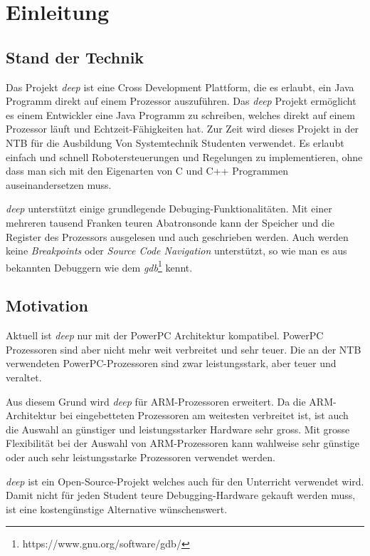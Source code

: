 \chapter{Einleitung}


\section{Stand der Technik}
Das Projekt \textit{deep} \cite{bib:DeepHome} ist eine Cross Development Plattform, die es erlaubt, ein Java Programm direkt auf einem Prozessor auszuführen.
Das \textit{deep} Projekt ermöglicht es einem Entwickler eine Java Programm zu schreiben, welches direkt auf einem Prozessor läuft und Echtzeit-Fähigkeiten hat.
Zur Zeit wird dieses Projekt in der NTB für die Ausbildung Von Systemtechnik Studenten verwendet.
Es erlaubt einfach und schnell Robotersteuerungen und Regelungen zu implementieren, ohne dass man sich mit den Eigenarten von C und C++ Programmen auseinandersetzen muss.

\textit{deep} unterstützt einige grundlegende Debuging-Funktionalitäten.
Mit einer mehreren tausend Franken teuren Abatronsonde kann der Speicher und die Register des Prozessors ausgelesen und auch geschrieben werden.
Auch werden keine \textit{Breakpoints} oder \textit{Source Code Navigation} unterstützt, so wie man es aus bekannten Debuggern wie dem \textit{gdb}\footnote{https://www.gnu.org/software/gdb/} kennt.



\section{Motivation}
Aktuell ist \textit{deep} nur mit der PowerPC Architektur kompatibel.
PowerPC Prozessoren sind aber nicht mehr weit verbreitet und sehr teuer.
Die an der NTB verwendeten PowerPC-Prozessoren sind zwar leistungsstark, aber teuer und veraltet.

Aus diesem Grund wird \textit{deep} für ARM-Prozessoren erweitert.
Da die ARM-Architektur bei eingebetteten Prozessoren am weitesten verbreitet ist, ist auch die Auswahl an günstiger und leistungsstarker Hardware sehr gross.
Mit grosse Flexibilität bei der Auswahl von ARM-Prozessoren kann wahlweise sehr günstige oder auch sehr leistungsstarke Prozessoren verwendet werden.

\textit{deep} ist ein Open-Source-Projekt welches auch für den Unterricht verwendet wird.
Damit nicht für jeden Student teure Debugging-Hardware gekauft werden muss, ist eine kostengünstige Alternative wünschenswert.

